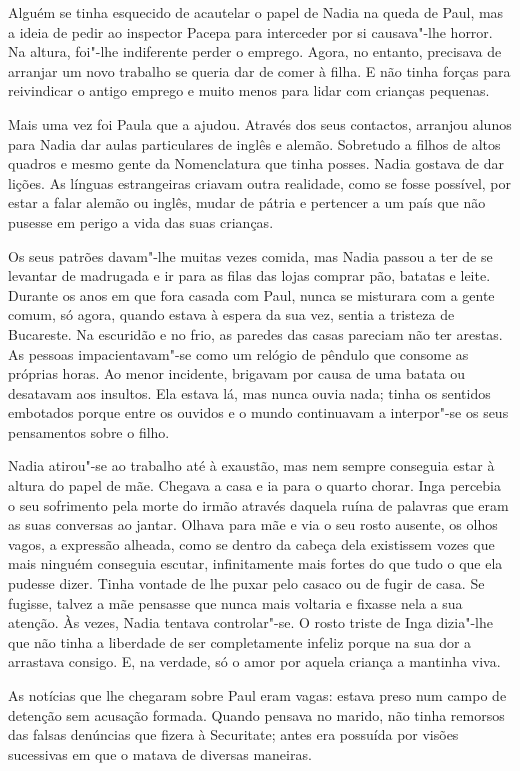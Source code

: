 Alguém se tinha esquecido de acautelar o papel de Nadia na queda de
Paul, mas a ideia de pedir ao inspector Pacepa para interceder por si
causava"-lhe horror. Na altura, foi"-lhe indiferente perder o emprego.
Agora, no entanto, precisava de arranjar um novo trabalho se queria dar
de comer à filha. E não tinha forças para reivindicar o antigo emprego e
muito menos para lidar com crianças pequenas.

Mais uma vez foi Paula que a ajudou. Através dos seus contactos,
arranjou alunos para Nadia dar aulas particulares de inglês e alemão.
Sobretudo a filhos de altos quadros e mesmo gente da Nomenclatura que
tinha posses. Nadia gostava de dar lições. As línguas estrangeiras criavam outra realidade, como se fosse possível, por estar a falar alemão ou
inglês, mudar de pátria e pertencer a um país que não pusesse em perigo
a vida das suas crianças.

Os seus patrões davam"-lhe muitas vezes comida,
mas Nadia passou a ter de se levantar de madrugada e ir para as filas
das lojas comprar pão, batatas e leite. Durante os anos em que fora
casada com Paul, nunca se misturara com a gente comum, só agora, quando
estava à espera da
sua vez, sentia a tristeza de Bucareste. Na escuridão e no frio, as
paredes das casas pareciam não ter arestas. As pessoas
impacientavam"-se como um relógio de pêndulo que consome as próprias
horas. Ao menor incidente, brigavam por causa de uma batata ou desatavam
aos insultos. Ela estava lá, mas nunca ouvia nada; tinha os sentidos
embotados porque entre os ouvidos e o mundo continuavam a interpor"-se
os seus pensamentos sobre o filho.

Nadia atirou"-se ao trabalho até à exaustão, mas nem sempre conseguia
estar à altura do papel de mãe. Chegava a casa e ia para o quarto
chorar. Inga percebia o seu sofrimento pela morte do irmão através
daquela ruína de palavras que eram as suas conversas ao jantar. Olhava
para mãe e via o seu rosto ausente, os olhos vagos, a expressão alheada,
como se dentro da cabeça dela existissem vozes que mais ninguém
conseguia escutar, infinitamente mais fortes do que tudo o que ela
pudesse dizer. Tinha vontade de lhe puxar pelo casaco ou de fugir de
casa. Se fugisse, talvez a mãe pensasse que nunca mais voltaria e
fixasse nela a sua atenção. Às vezes, Nadia tentava controlar"-se. O
rosto triste de Inga dizia"-lhe que não tinha a liberdade de ser
completamente infeliz porque na sua dor a arrastava consigo. E, na
verdade, só o amor por aquela criança a mantinha viva.

As notícias que lhe chegaram sobre Paul eram vagas:
estava preso num campo de detenção sem acusação formada. Quando
pensava no marido, não tinha remorsos das falsas denúncias que fizera à
Securitate; antes era possuída por visões sucessivas em que o matava de
diversas maneiras.

